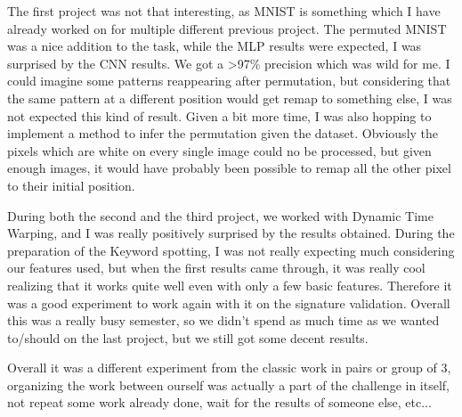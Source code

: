 \documentclass{homework}
\begin{document}
The first project was not that interesting, as MNIST is something which I have already worked on for multiple different previous project. The permuted MNIST was a nice addition to the task, while the MLP results were expected, I was surprised by the CNN results. We got a >97\% precision which was wild for me. I could imagine some patterns reappearing after permutation, but considering that the same pattern at a different position would get remap to something else, I was not expected this kind of result. Given a bit more time, I was also hopping to implement a method to infer the permutation given the dataset. Obviously the pixels which are white on every single image could no be processed, but given enough images, it would have probably been possible to remap all the other pixel to their initial position. 

During both the second and the third project, we worked with Dynamic Time Warping, and I was really positively surprised by the results obtained. During the preparation of the Keyword spotting, I was not really expecting much considering our features used, but when the first results came through, it was really cool realizing that it works quite well even with only a few basic features. Therefore it was a good experiment to work again with it on the signature validation. Overall this was a really busy semester, so we didn't spend as much time as we wanted to/should on the last project, but we still got some decent results.

Overall it was a different experiment from the classic work in pairs or group of 3, organizing the work between ourself was actually a part of the challenge in itself, not repeat some work already done, wait for the results of someone else, etc... 
\end{document}
